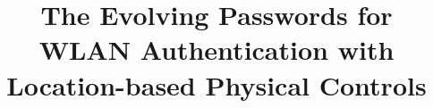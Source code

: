 \documentclass{article}
\begin{document}
	\title{The Evolving Passwords for WLAN Authentication with Location-based Physical Controls}
	\author{}
	\date{}
	\maketitle
	
	
	
	
	
	
	
	
\end{document}

